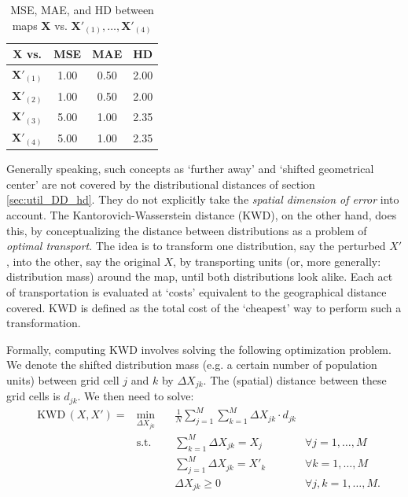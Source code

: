 \begin{tcolorbox}[breakable]
\begin{table}[H]
    \centering
    \begin{tabular}{c | c c c |}
    $\mathbf{X}$ vs. & MSE & MAE & HD \\
    \hline
    $\mathbf{X}'_{(1)}$ & 1.00 & 0.50 & 2.00 \\
    $\mathbf{X}'_{(2)}$ & 1.00 & 0.50 & 2.00 \\
    \hline
    $\mathbf{X}'_{(3)}$ & 5.00 & 1.00 & 2.35 \\
    $\mathbf{X}'_{(4)}$ & 5.00 & 1.00 & 2.35 \\
        \hline
    \end{tabular}
    \caption{MSE, MAE, and HD between maps $\mathbf{X}$ vs. $\mathbf{X}'_{(1)}, \dots, \mathbf{X}'_{(4)}$}
    \label{tab:util_nokwd}
\end{table}
\end{tcolorbox}

Generally speaking, such concepts as `further away' and `shifted geometrical center' are not covered by the distributional distances of section \ref{sec:util_DD_hd}. They do not explicitly take the \emph{spatial dimension of error} into account. The Kantorovich-Wasserstein distance (KWD), on the other hand, does this, by conceptualizing the distance between distributions as a problem of \emph{optimal transport}.
The idea is to transform one distribution, say the perturbed $X'$, into the other, say the original $X$, by transporting units (or, more generally: distribution mass) around the map, until both distributions look alike. Each act of transportation is evaluated at `costs' equivalent to the geographical distance covered.
KWD is defined as the total cost of the `cheapest' way to perform such a transformation.

Formally, computing KWD involves solving the following optimization problem. We denote the shifted distribution mass (e.g. a certain number of population units) between grid cell $j$ and $k$ by $\Delta X_{jk}$. The (spatial) distance between these grid cells is $d_{jk}$. We then need to solve:
\begin{equation} \label{eq:util_kwd}
\begin{aligned}
    & \mathrm{KWD}\,(X, X') = & \underset{\Delta X_{jk}}{\text{min}} \quad & \frac{1}{N} \sum_{j=1}^M \sum_{k=1}^M \Delta X_{jk} \cdot d_{jk} & \\
    & & \text{s.t.} \quad & \sum_{k=1}^M \Delta X_{jk} = X_j & \forall j = 1, \dots, M\\
    & & & \sum_{j=1}^M \Delta X_{jk} = X'_k & \forall k = 1, \dots, M \\
    & & & \Delta X_{jk} \geq 0 & \forall j,k = 1, \dots, M.
\end{aligned}
\end{equation}

